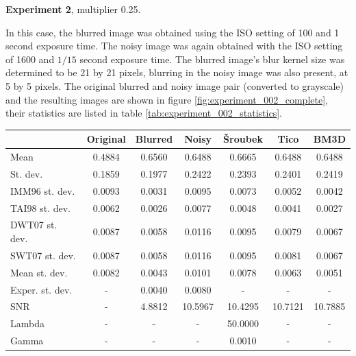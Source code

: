 \documentclass[12pt,notitlepage]{report}
\begin{document}
\noindent \textbf{Experiment 2}, multiplier 0.25.

In this case, the blurred image was obtained using the ISO setting of 100 and 1 second exposure time. The noisy image was again obtained with the ISO setting of 1600 and $1/15$ second exposure time. The blurred image's blur kernel size was determined to be 21 by 21 pixels, blurring in the noisy image was also present, at 5 by 5 pixels. The original blurred and noisy image pair (converted to grayscale) and the resulting images are shown in figure \ref{fig:experiment_002_complete}, their statistics are listed in table \ref{tab:experiment_002_statistics}.

\begin{table}[htb]
  \centering
  \begin{tabular}{ | l | c | c | c | c | c | c | }
    \hline
		           & Original & Blurred & Noisy   & Šroubek & Tico    & BM3D    \\ \hline
	Mean           & 0.4884   & 0.6560  & 0.6488  & 0.6665  & 0.6488  & 0.6488  \\ \hline
	St. dev.       & 0.1859   & 0.1977  & 0.2422  & 0.2393  & 0.2401  & 0.2419  \\ \hline
	IMM96 st. dev. & 0.0093   & 0.0031  & 0.0095  & 0.0073  & 0.0052  & 0.0042  \\ \hline
	TAI98 st. dev. & 0.0062   & 0.0026  & 0.0077  & 0.0048  & 0.0041  & 0.0027  \\ \hline
	DWT07 st. dev. & 0.0087   & 0.0058  & 0.0116  & 0.0095  & 0.0079  & 0.0067  \\ \hline
	SWT07 st. dev. & 0.0087   & 0.0058  & 0.0116  & 0.0095  & 0.0081  & 0.0067  \\ \hline
	Mean st. dev.  & 0.0082   & 0.0043  & 0.0101  & 0.0078  & 0.0063  & 0.0051  \\ \hline
	Exper. st. dev.& -        & 0.0040  & 0.0080  & -       & -       & -       \\ \hline
	SNR            & -        & 4.8812  & 10.5967 & 10.4295 & 10.7121 & 10.7885 \\ \hline
	Lambda         & -        & -       & -       & 50.0000 & -       & -       \\ \hline
	Gamma          & -        & -       & -       & 0.0010  & -       & -       \\ \hline


\end{tabular}
\end{table}
\end{document}

